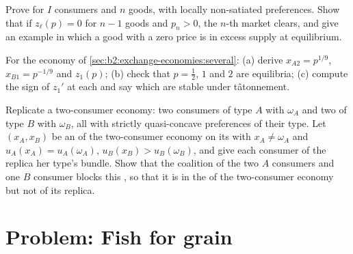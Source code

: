 \begin{exercise}[$\star\star\star$]\label{exo:b2:exchange-economies:10}
Prove  for $I$ consumers and $n$ goods, with locally non-satiated preferences. Show that if
$z_\ell(p) = 0$ for $n - 1$ goods and $p_n > 0$, the $n$-th market clears, and give an example in which
a good with a zero price is in excess supply at equilibrium.
\end{exercise}

\begin{exercise}[$\star\star\star$]\label{exo:b2:exchange-economies:11}
For the economy of \cref{sec:b2:exchange-economies:several}: (a) derive $x_{A2} = p^{1/9}$, $x_{B1} =
p^{-1/9}$ and $z_1(p)$; (b) check that $p = \tfrac12$, $1$ and $2$ are equilibria; (c) compute the sign
of $z_1'$ at each and say which are stable under tâtonnement.
\end{exercise}

\begin{exercise}[$\star\star\star$]\label{exo:b2:exchange-economies:12}
Replicate a two-consumer economy: two consumers of type $A$ with  $\omega_A$ and two of type
$B$ with $\omega_B$, all with strictly quasi-concave preferences of their type. Let $(x_A, x_B)$ be an
 of the two-consumer economy on its  with $x_A \neq \omega_A$ and $u_A(x_A) =
u_A(\omega_A)$, $u_B(x_B) > u_B(\omega_B)$, and give each consumer of the replica her type's bundle.
Show that the coalition of the two $A$ consumers and one $B$ consumer blocks this , so that it
is in the  of the two-consumer economy but not of its replica.
\end{exercise}

\section{Problem: Fish for grain}\label{sec:b2:exchange-economies:problem}

